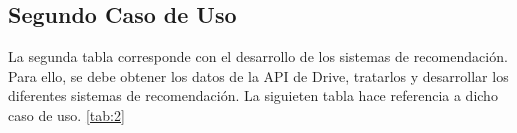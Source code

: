 \subsection{Segundo Caso de Uso}
La segunda tabla corresponde con el desarrollo de los sistemas de recomendación. Para ello, se debe obtener los datos de la API de Drive, tratarlos y desarrollar los diferentes sistemas de recomendación. La siguieten tabla hace referencia a dicho caso de uso. \ref{tab:2}
\begin{table}[]
\caption{Tabla Caso de Uso 2}
\label{tab:2}
\end{table}




